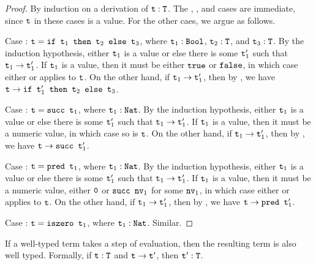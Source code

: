 \documentclass[11pt,twoside=off,numbers=noenddot]{scrbook}
\begin{document}
\begin{proof}
  By induction on a derivation of $\texttt{t} : \texttt{T}$. The
  , , and  cases are immediate,
  since $\texttt{t}$ in these cases is a value. For the other caes, we
  argue as follows.

  Case : $\texttt{t} = \texttt{if $\texttt{t}_1$ then $\texttt{t}_2$ else
  $\texttt{t}_3$}$, where $\texttt{t}_1 : \texttt{Bool}$, $\texttt{t}_2 :
  \texttt{T}$, and $\texttt{t}_3 : \texttt{T}$.
  By the induction hypothesis, either $\texttt{t}_1$ is a value or else
  there is some $\texttt{t}_1'$ such that $\texttt{t}_1 \rightarrow
  \texttt{t}_1'$. If $\texttt{t}_1$ is a value, then it must be either
  $\texttt{true}$ or $\texttt{false}$, in which case either 
  or  applies to $\texttt{t}$. On the other hand, if
  $\texttt{t}_1 \rightarrow \texttt{t}_1'$, then by , we have
  $\texttt{t} \rightarrow \texttt{if $\texttt{t}_1'$ then $\texttt{t}_2$ else $\texttt{t}_3$}$.

  Case : $\texttt{t} = \texttt{succ $\texttt{t}_1$}$, where
  $\texttt{t}_1 : \texttt{Nat}$. By the induction hypothesis, either
  $\texttt{t}_1$ is a value or else there is some $\texttt{t}_1'$ such that
  $\texttt{t}_1 \rightarrow \texttt{t}_1'$. If $\texttt{t}_1$ is a value, then
  it must be a numeric value, in which case so is $\texttt{t}$. On the
  other hand, if $\texttt{t}_1 \rightarrow \texttt{t}_1'$, then by
  , we have $\texttt{t} \rightarrow \texttt{succ $\texttt{t}_1'$}$.

  Case : $\texttt{t} = \texttt{pred $\texttt{t}_1$}$, where
  $\texttt{t}_1 : \texttt{Nat}$. By the induction hypothesis, either
  $\texttt{t}_1$ is a value or else there is some $\texttt{t}_1'$ such that
  $\texttt{t}_1 \rightarrow \texttt{t}_1'$. If $\texttt{t}_1$ is a value, then
  it must be a numeric value, either $\texttt{0}$ or $\texttt{succ
  $\texttt{nv}_1$}$ for some $\texttt{nv}_1$, in which case either
   or  applies to $\texttt{t}$. On the
  other hand, if $\texttt{t}_1 \rightarrow \texttt{t}_1'$, then by
  , we have $\texttt{t} \rightarrow \texttt{pred $\texttt{t}_1'$}$.

  Case : $\texttt{t} = \texttt{iszero $\texttt{t}_1$}$, where
  $\texttt{t}_1 : \texttt{Nat}$. Similar.
\end{proof}

\begin{theorem}[Preservation]
  If a well-typed term takes a step of evaluation, then the resulting
  term is also well typed. Formally, if $\texttt{t} : \texttt{T}$ and
  $\texttt{t} \rightarrow \texttt{t}'$, then $\texttt{t}' : \texttt{T}$.
\end{theorem}
\end{document}
